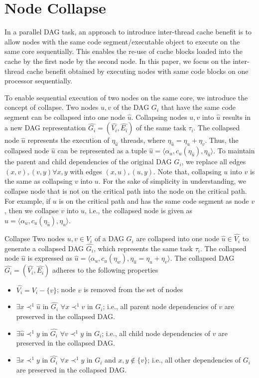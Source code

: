 \section{Node Collapse}
In a parallel DAG task, an approach to introduce inter-thread cache benefit is to allow nodes with the same code segment/executable object to execute on the same core sequentially. This enables the re-use of cache blocks loaded into the cache by the first node by the second node. In this paper, we focus on the inter-thread cache benefit obtained by executing nodes with same code blocks on one processor sequentially. 

To enable sequential execution of two nodes on the same core, we introduce the concept of collapse. Two nodes $u,v$ of the DAG $G_i$ that have the same code segment can be collapsed into one node $\hat{u}$. Collapsing nodes $u,v$ into $\hat{u}$ results in a new DAG representation $\hat{G_i} = (\hat{V_i}, \hat{E_i})$ of the same task $\tau_i$. The collapsed node $\hat{u}$ represents the execution of $\eta_{\hat{u}}$ threads, where $\eta_{\hat{u}} = \eta_u+\eta_v$. Thus, the collapsed node $\hat{u}$ can be represented as a tuple $\hat{u} = \langle \alpha_u , c_u(\eta_{\hat{u}}), \eta_{\hat{u}} \rangle$. To maintain the parent and child dependencies of the original DAG $G_i$, we replace all edges $(x , v) , (v, y) \forall x, y$ with edges $(x, u), (u, y)$. Note that, collapsing $u$ into $v$ is the same as collapsing $v$ into $u$. For the sake of simplicity in understanding, we collapse node that is not on the critical path into the node on the critical path. For example, if $u$ is on the critical path and has the same code segment as node $v$, then we collapse $v$ into $u$, i.e., the collapsed node is given as $\hat{u} =  \langle \alpha_u , c_u(\eta_{\hat{u}}), \eta_{\hat{u}} \rangle$.
 
 
 
 \begin{definition}{Collapse}
Two nodes $u,v \in V_i$ of a DAG $G_i$ are collapsed into one node $\hat{u} \in \hat{V_i}$ to generate a collapsed DAG $\hat{G_i}$, which represents the same task $\tau_i$. The collapsed node $\hat{u}$ is expressed as $\hat{u} = \langle \alpha_u , c_u(\eta_w), \eta_{\hat{u}} = \eta_u+\eta_v \rangle$. The collapsed DAG $\hat{G_i} = (\hat{V_i}, \hat{E_i})$ adheres to the following properties
\begin{itemize}
\item $\hat{V_i} = V_i - \{v\}$; node $v$ is removed from the set of nodes
\item $\exists x \prec^{1} \hat{u}$ in $\hat{G_i}$ $\forall x \prec^1 v$ in $G_i$; i.e., all parent node dependencies of $v$ are preserved in the collapsed DAG.
\item $\exists \hat{u} \prec^{1} y$ in $\hat{G_i}$ $\forall v \prec^1 y$ in $G_i$; i.e., all child node dependencies of $v$ are preserved in the collapsed DAG.
\item $\exists x \prec^{1} y$ in $\hat{G_i}$ $\forall x \prec^1 y$ in $G_i$ and $x, y \notin \{v\}$; i.e., all other dependencies of $G_i$ are preserved in the collapsed DAG.
\end{itemize}
 \end{definition}

